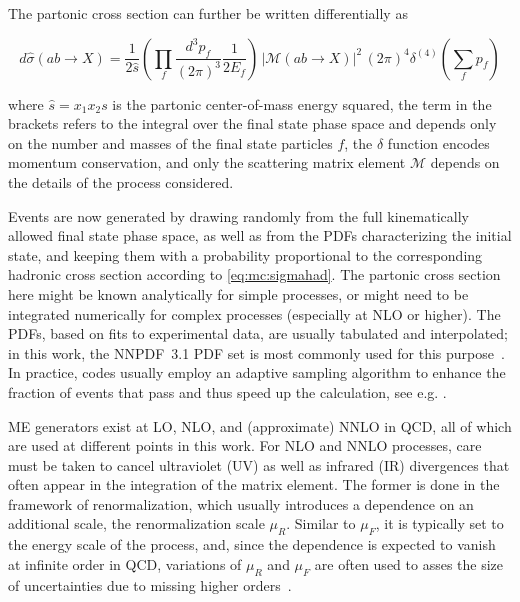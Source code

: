 
The partonic cross section can further be written differentially as~\cite{Peskin:1995ev}

\begin{equation}
    d \hat{\sigma} (a b \rightarrow X) = \frac{1}{2 \hat{s}} \left( \prod_f \frac{d^3 p_f}{(2\pi)^3} \frac{1}{2 E_f} \right) \, \left| \mathcal{M} (a b \rightarrow 
    X ) \right|^2 \, (2\pi)^4 \delta^{(4)} \left( \sum_f p_f \right)
\end{equation}

\noindent where $\hat{s} = x_1 x_2 s$ is the partonic center-of-mass energy squared, the term in the brackets refers to the integral over the final state phase space and depends only on the number and masses of the final state particles $f$, the $\delta$ function encodes momentum conservation, and only the scattering matrix element $\mathcal{M}$ depends on the details of the process considered.

Events are now generated by drawing randomly from the full kinematically allowed final state phase space, as well as from the PDFs characterizing the initial state, and keeping them with a probability proportional to the corresponding hadronic cross section according to \cref{eq:mc:sigmahad}. The partonic cross section here might be known analytically for simple processes, or might need to be integrated numerically for complex processes (especially at NLO or higher). The PDFs, based on fits to experimental data, are usually tabulated and interpolated; in this work, the NNPDF~3.1 PDF set is most commonly used for this purpose~\cite{NNPDF:2017mvq}. In practice, codes usually employ an adaptive sampling algorithm to enhance the fraction of events that pass and thus speed up the calculation, see e.g. .

ME generators exist at LO, NLO, and (approximate) NNLO in QCD, all of which are used at different points in this work. For NLO and NNLO processes, care must be taken to cancel ultraviolet (UV) as well as infrared (IR) divergences that often appear in the integration of the matrix element. The former is done in the framework of renormalization, which usually introduces a dependence on an additional scale, the renormalization scale $\mu_R$. Similar to $\mu_F$, it is typically set to the energy scale of the process, and, since the dependence is expected to vanish at infinite order in QCD, variations of $\mu_R$ and $\mu_F$ are often used to asses the size of uncertainties due to missing higher orders~\cite{Schwartz:2014sze}.

